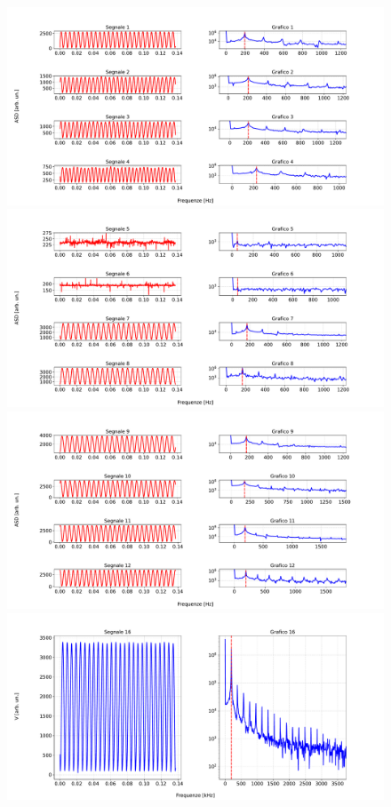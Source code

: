 \documentclass{article}
\begin{document}
\begin{figure}[H]
    \centering
    \includegraphics[width=\textwidth]{FFT11/first_graph.pdf}
    \includegraphics[width=\textwidth]{FFT11/second_graph.pdf}
    \includegraphics[width=\textwidth]{FFT11/third_graph.pdf}
    \includegraphics[width=\textwidth]{FFT11/fourth_graph.pdf}
\end{figure}
\end{document}
